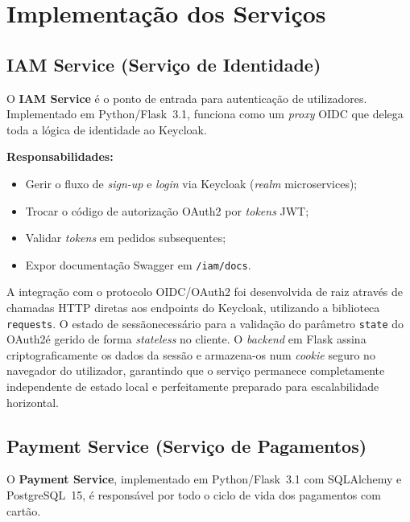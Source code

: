\documentclass[12pt,a4paper]{article}
\begin{document}
\section{Implementação dos Serviços}
\label{sec:servicos}

\subsection{IAM Service (Serviço de Identidade)}

O \textbf{IAM Service} é o ponto de entrada para autenticação de utilizadores. Implementado
em Python/Flask~3.1, funciona como um \emph{proxy} OIDC que delega toda a lógica de
identidade ao Keycloak.

\textbf{Responsabilidades:}
\begin{itemize}[noitemsep]
  \item Gerir o fluxo de \emph{sign-up} e \emph{login} via Keycloak (\emph{realm} microservices);
  \item Trocar o código de autorização OAuth2 por \emph{tokens} JWT;
  \item Validar \emph{tokens} em pedidos subsequentes;
  \item Expor documentação Swagger em \texttt{/iam/docs}.
\end{itemize}

A integração com o protocolo OIDC/OAuth2 foi desenvolvida de raiz através de chamadas 
HTTP diretas aos endpoints do Keycloak, utilizando a biblioteca \texttt{requests}. 
O estado de sessãonecessário para a validação do parâmetro \texttt{state} do 
OAuth2é gerido de forma \emph{stateless} no cliente. O \emph{backend} em Flask 
assina criptograficamente os dados da sessão e armazena-os num \emph{cookie} seguro 
no navegador do utilizador, garantindo que o serviço permanece completamente 
independente de estado local e perfeitamente preparado para escalabilidade horizontal.

\subsection{Payment Service (Serviço de Pagamentos)}

O \textbf{Payment Service}, implementado em Python/Flask~3.1 com SQLAlchemy e
PostgreSQL~15, é responsável por todo o ciclo de vida dos pagamentos com cartão.
\end{document}
